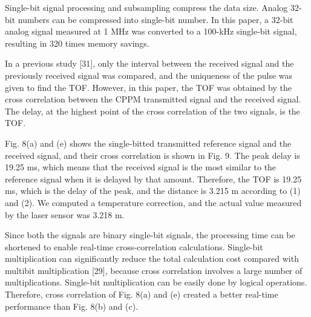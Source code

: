 Single-bit signal processing and subsampling compress the data size. Analog 32-bit numbers can be compressed into single-bit number. In this paper, a 32-bit analog signal measured at 1 MHz was converted to a 100-kHz single-bit signal, resulting in 320 times memory savings.

In a previous study [31], only the interval between the received signal and the previously received signal was compared, and the uniqueness of the pulse was given to find the TOF. However, in this paper, the TOF was obtained by the cross correlation between the CPPM transmitted signal and the received signal. The delay, at the highest point of the cross correlation of the two signals, is the TOF.

Fig. 8(a) and (e) shows the single-bitted transmitted reference signal and the received signal, and their cross correlation is shown in Fig. 9. The peak delay is 19.25 ms, which means that the received signal is the most similar to the reference signal when it is delayed by that amount. Therefore, the TOF is 19.25 ms, which is the delay of the peak, and the distance is 3.215 m according to (1) and (2). We computed a temperature correction, and the actual value measured by the laser sensor was 3.218 m.

Since both the signals are binary single-bit signals, the processing time can be shortened to enable real-time cross-correlation calculations. Single-bit multiplication can significantly reduce the total calculation cost compared with multibit multiplication [29], because cross correlation involves a large number of multiplications. Single-bit multiplication can be easily done by logical operations. Therefore, cross correlation of Fig. 8(a) and (e) created a better real-time performance than Fig. 8(b) and (c).
